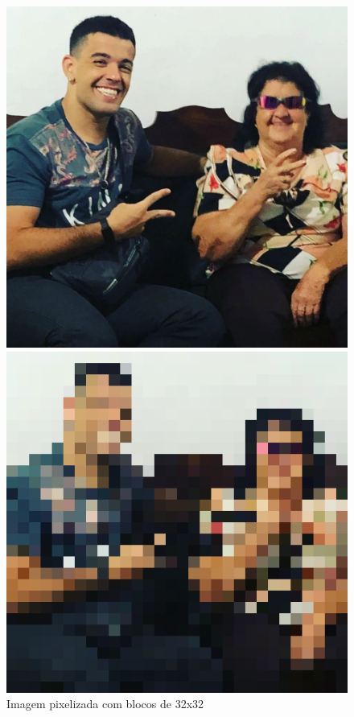 \begin{figure}[htbp]
    \centering
        \begin{minipage}{0.4\textwidth}
            \includegraphics[width=\textwidth]{figuras/pixelizacao/foto.jpeg}
        \end{minipage}
        \begin{minipage}{0.4\textwidth}
            \includegraphics[width=\textwidth]{figuras/pixelizacao/32.png}
        \end{minipage}
    \caption{Imagem pixelizada com blocos de 32x32}
    \label{fig:Imagem pixelizada}
\end{figure}
\newpage










